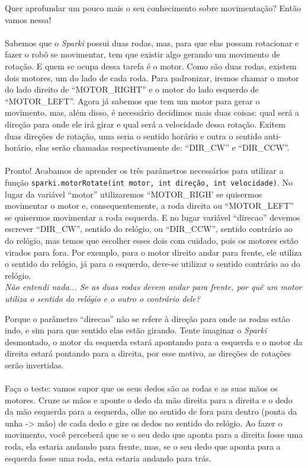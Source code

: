 Quer aprofundar um pouco mais o seu conhecimento sobre movimentação? Então vamos nessa!
\paragraph{}
Sabemos que o \textsl{Sparki} possui duas rodas, mas, para que elas possam rotacionar e fazer o robô se movimentar, tem que existir algo gerando um movimento de rotação. E quem se ocupa dessa tarefa é o motor. Como são duas rodas, existem dois motores, um do lado de cada roda. Para padronizar, iremos chamar o motor do lado direito de ``MOTOR\_RIGHT'' e o motor do lado esquerdo de ``MOTOR\_LEFT''. Agora já sabemos que tem um motor para gerar o movimento, mas, além disso, é necessário decidimos mais duas coisas: qual será a direção para onde ele irá girar e qual será a velocidade dessa rotação. Exitem duas direções de rotação, uma seria o sentido horário e outra o sentido anti-horário, elas serão chamadas respectivamente de: ``DIR\_CW'' e ``DIR\_CCW''.
\paragraph{}
Pronto! Acabamos de aprender os três parâmetros necessários para utilizar a função \lstinline[columns=fixed]{sparki.motorRotate(int motor, int direção, int velocidade)}. No lugar da variável ``motor'' utilizaremos ``MOTOR\_RIGH' se quisermos movimentar o motor e, consequentemente, a roda direita ou ``MOTOR\_LEFT'' se quisermos movimentar a roda esquerda. E no lugar variável ``direcao'' devemos escrever ``DIR\_CW'', sentido do relógio, ou ``DIR\_CCW'', sentido contrário ao do relógio, mas temos que escolher esses dois com cuidado, pois os motores estão virados para fora. Por exemplo, para o motor direito andar para frente, ele utiliza o sentido do relógio, já para o esquerdo, deve-se utilizar o sentido contrário ao do relógio.\\

\textit{Não entendi nada... Se as duas rodas devem andar para frente, por quê um motor utiliza o sentido do relógio e o outro o contrário dele?}\par
Porque o parâmetro ``direcao'' não se refere à direção para onde as rodas estão indo, e sim para que sentido elas estão girando. Tente imaginar o \textsl{Sparki} desmontado, o motor da esquerda estará apontando para a esquerda e o motor da direita estará pontando para a direita, por esse motivo, as direções de rotações serão invertidas. 
\paragraph{}
Faça o teste: vamos supor que os seus dedos são as rodas e as suas mãos os motores. Cruze as mãos e aponte o dedo da mão direita para a direita e o dedo da mão esquerda para a esquerda, olhe no sentido de fora para dentro (ponta da unha -> mão) de cada dedo e gire os dedos no sentido do relógio. Ao fazer o movimento, você perceberá que se o seu dedo que aponta para a direita fosse uma roda, ela estaria andando para frente, mas, se o seu dedo que aponta para a esquerda fosse uma roda, esta estaria andando para trás.
